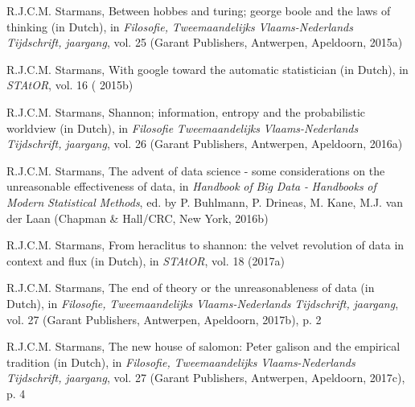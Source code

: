 \begin{list}{}{\setlength{\leftmargin}{2.1em}\setlength{\labelwidth}{0pt}
  \setlength{\labelsep}{0pt}\setlength{\itemindent}{-2.1em}
  \setlength{\parsep}{0pt}\setlength{\itemsep}{2pt}\setlength{\topsep}{0pt}}
\item\label{refentry:REF377}R.J.C.M. Starmans, Between hobbes and turing; george boole and the laws of thinking (in Dutch), in \textit{Filosofie,} \textit{Tweemaandelijks} \textit{Vlaams-Nederlands} \textit{Tijdschrift,} \textit{jaargang}, vol. 25 (Garant Publishers, Antwerpen, Apeldoorn, 2015a)\label{refend:REF377}
\item\label{refentry:REF378}R.J.C.M. Starmans, With google toward the automatic statistician (in Dutch), in \textit{STAtOR}, vol. 16 ( 2015b)\label{refend:REF378}
\item\label{refentry:REF379}R.J.C.M. Starmans, Shannon; information, entropy and the probabilistic worldview (in Dutch), in \textit{Filosofie} \textit{Tweemaandelijks} \textit{Vlaams-Nederlands} \textit{Tijdschrift,} \textit{jaargang}, vol. 26 (Garant Publishers, Antwerpen, Apeldoorn, 2016a)\label{refend:REF379}
\item\label{refentry:REF380}R.J.C.M. Starmans, The advent of data science - some considerations on the unreasonable effectiveness of data, in \textit{Handbook} \textit{of} \textit{Big} \textit{Data} \textit{-} \textit{Handbooks} \textit{of} \textit{Modern} \textit{Statistical} \textit{Methods}, ed. by P. Buhlmann, P. Drineas, M. Kane, M.J. van der Laan (Chapman \& Hall/CRC, New York, 2016b)\label{refend:REF380}
\item\label{refentry:REF381}R.J.C.M. Starmans, From heraclitus to shannon: the velvet revolution of data in context and flux (in Dutch), in \textit{STAtOR}, vol. 18 (2017a)\label{refend:REF381}
\item\label{refentry:REF382}R.J.C.M. Starmans, The end of theory or the unreasonableness of data (in Dutch), in \textit{Filosofie,} \textit{Tweemaandelijks} \textit{Vlaams-Nederlands} \textit{Tijdschrift,} \textit{jaargang}, vol. 27 (Garant Publishers, Antwerpen, Apeldoorn, 2017b), p. 2\label{refend:REF382}
\item\label{refentry:REF383}R.J.C.M. Starmans, The new house of salomon: Peter galison and the empirical tradition (in Dutch), in \textit{Filosofie,} \textit{Tweemaandelijks} \textit{Vlaams-Nederlands} \textit{Tijdschrift,} \textit{jaargang}, vol. 27 (Garant Publishers, Antwerpen, Apeldoorn, 2017c), p. 4\label{refend:REF383}

\end{list}
